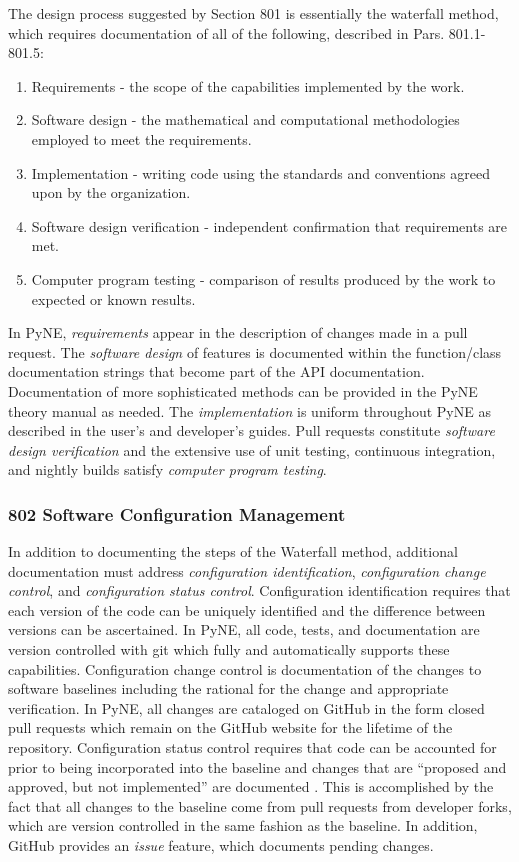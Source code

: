 \documentclass{anstrans}
\begin{document}
The design process suggested by Section 801 is essentially the waterfall method, which requires documentation of all of the following, described in Pars. 801.1-801.5:

\begin{enumerate} 
\item{Requirements - the scope of the capabilities implemented by the work.}
\item{Software design - the mathematical and computational methodologies employed to meet the requirements.}
\item{Implementation - writing code using the standards and conventions agreed upon by the organization.}
\item{Software design verification - independent confirmation that requirements are met.}
\item{Computer program testing - comparison of results produced by the work to expected or known results.}
\end{enumerate}

In PyNE, \emph{requirements} appear in the description of changes made in
a pull request. 
The \emph{software design} of features is documented
within the function/class documentation strings that become part of the API
documentation. Documentation of more sophisticated methods can be provided in the PyNE
theory manual as needed. The \emph{implementation} is uniform throughout PyNE as 
described in the user's and developer's guides. Pull requests constitute 
\emph{software design verification} and the extensive use of unit testing, 
continuous integration, and nightly builds
satisfy \emph{computer program testing}.

\subsubsection{802 Software Configuration Management}

In addition to documenting the steps of the Waterfall method, additional
documentation must address \emph{configuration identification}, \emph{configuration change
control}, and \emph{configuration status control}. Configuration identification
requires that each version of the code can be uniquely identified and the
difference between versions can be ascertained. In PyNE, all code, tests, and
documentation are version controlled with git which fully and automatically 
supports these
capabilities. Configuration change control is documentation of the changes to
software baselines including the rational for the change and appropriate
verification. In PyNE, all changes are cataloged on GitHub in the form closed pull
requests which remain on the GitHub website for the lifetime of the repository.
Configuration status control requires that code can be accounted for prior to
being incorporated into the baseline and changes that are ``proposed and approved,
but not implemented'' are documented \cite{add}. This is accomplished by the fact that all
changes to the baseline come from pull requests from developer forks, which are
version controlled in the same fashion as the baseline. In addition, GitHub
provides an \emph{issue} feature, which documents pending changes.
\end{document}
